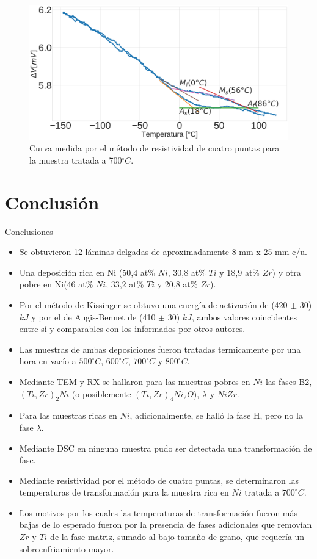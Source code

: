 \documentclass[11pt]{beamer}
\begin{document}
			\begin{frame}
				\begin{figure}[H]
					\centering
					\includegraphics[scale=0.18]{img/Resistance_700.png}
					\caption*{Curva medida por el método de resistividad de cuatro puntas para la muestra tratada a 700$^\circ C$.}
				\end{figure}
			\end{frame}
	

\section{Conclusión}
	\begin{frame}[allowframebreaks]{Conclusiones}
		\begin{itemize}
			\item Se obtuvieron 12 láminas delgadas de aproximadamente 8 mm x 25 mm c/u.
			\item Una deposición rica en Ni (50,4 at\% $Ni$, 30,8 at\% $Ti$ y 18,9 at\% $Zr$) y otra pobre en Ni(46 at\% $Ni$, 33,2 at\% $Ti$ y 20,8 at\% $Zr$).
			\item Por el método de Kissinger se obtuvo una energía de activación de (420 $\pm$ 30) $kJ$ y por el de Augis-Bennet de (410 $\pm$ 30) $kJ$, ambos valores coincidentes entre sí y comparables con los informados por otros autores.
			\item Las muestras de ambas deposiciones fueron tratadas termicamente por una hora en vacío a $500^\circ C$, $600^\circ C$, $700^\circ C$ y $800^\circ C$.
			\item Mediante TEM y RX se hallaron para las muestras pobres en $Ni$ las fases B2, $(Ti, Zr)_2Ni$ (o posiblemente $(Ti, Zr)_4Ni_2O$), $\lambda$ y $NiZr$.
			\item Para las muestras ricas en $Ni$, adicionalmente, se halló la fase H, pero no la fase $\lambda$.
			\item Mediante DSC en ninguna muestra pudo ser detectada una transformación de fase.
			\item Mediante resistividad por el método de cuatro puntas, se determinaron las temperaturas de transformación para la muestra rica en $Ni$ tratada a $700^\circ C$.
			\item Los motivos por los cuales las temperaturas de transformación fueron más bajas de lo esperado fueron por la presencia de fases adicionales que removían $Zr$ y $Ti$ de la fase matriz, sumado al bajo tamaño de grano, que requería un sobreenfriamiento mayor.
		\end{itemize}
	\end{frame}
	
\end{document}

